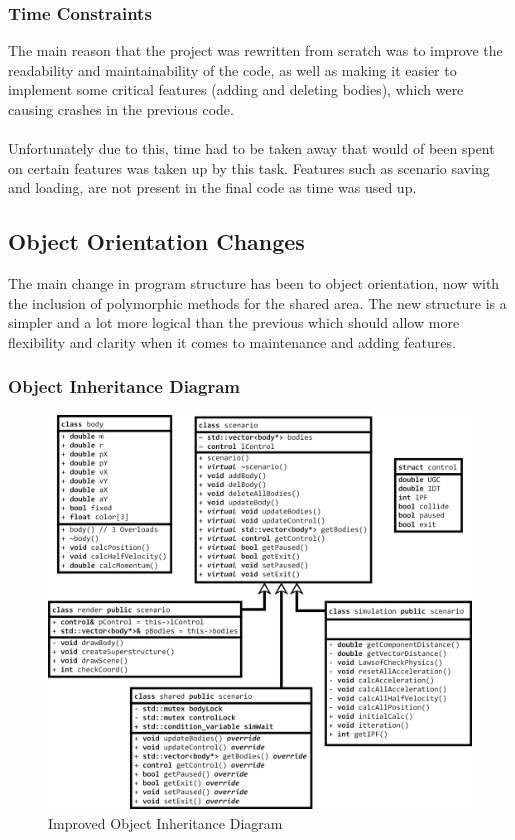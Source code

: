 {\subsubsection{Time Constraints}
The main reason that the project was rewritten from scratch was to improve the readability and maintainability of the code, as well as making it easier to implement some critical features (adding and deleting bodies), which were causing crashes in the previous code.

\paragraph{}
Unfortunately due to this, time had to be taken away that would of been spent on certain features was taken up by this task. Features such as scenario saving and loading, are not present in the final code as time was used up.

\subsection{Object Orientation Changes}
The main change in program structure has been to object orientation, now with the inclusion of polymorphic methods for the shared area. The new structure is a simpler and a lot more logical than the previous which should allow more flexibility and clarity when it comes to maintenance and adding features.

\pagebreak
\subsubsection{Object Inheritance Diagram}
\begin{figure}[!ht]
  \centering
  \includegraphics[width=\textwidth]{img/didredo.png}
  \caption{Improved Object Inheritance Diagram}
\end{figure}

}

